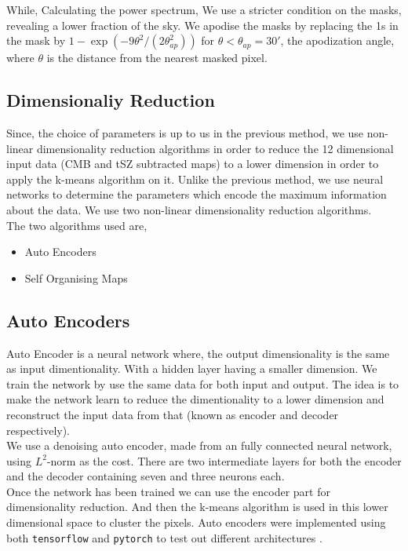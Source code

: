 While, Calculating the power spectrum, We use a stricter condition on the masks, revealing a lower fraction of the sky. We apodise the masks by replacing the 1s
in the mask by $1 - \exp(-9\theta^2 / (2 \theta_{ap}^2))$ for $\theta < \theta_{ap} = 30'$, the apodization angle, where $\theta$ is the distance from the
nearest masked pixel.

\subsection{Dimensionaliy Reduction}
Since, the choice of parameters is up to us in the previous method, we use non-linear dimensionality
reduction algorithms in order to reduce the 12 dimensional input data (CMB and tSZ
subtracted maps) to a lower dimension in order to
apply the k-means algorithm on it. Unlike the previous method,
we use neural networks to determine the
parameters which encode the maximum information about the data.
We use two non-linear dimensionality
reduction algorithms.\\
The two algorithms used are, 
\begin{itemize}
  \item Auto Encoders
  \item Self Organising Maps
\end{itemize}

\subsection{Auto Encoders}
Auto Encoder is a neural network where, the output dimensionality is the same as input dimentionality.
With a hidden layer having a smaller dimension. We train the network by use the same data for both input and output.
The idea is to make the network learn to reduce the dimentionality to a lower dimension and reconstruct the
input data from that (known as encoder and decoder respectively).
\\
We use a denoising auto encoder, made from an fully connected neural network, using $L^2$-norm as
the cost. There are two intermediate layers for both the encoder and the decoder containing seven and three neurons
each.\\
Once the network has been trained we can use the encoder part for dimensionality reduction.
And then the k-means algorithm is used in this lower dimensional space to cluster the pixels.
Auto encoders were implemented using both \texttt{tensorflow} and \texttt{pytorch} to test out different architectures
\cite{tensorflow, pytorch}.

